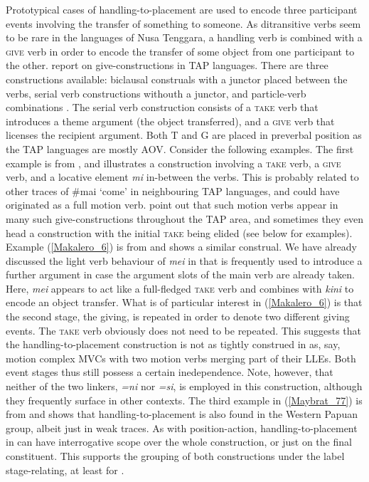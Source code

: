 Prototypical cases of handling-to-placement are used to encode three participant events involving the transfer of something to someone. As ditransitive verbs seem to be rare in the languages of Nusa Tenggara, a handling verb is combined with a \textsc{give} verb in order to encode the transfer of some object from one participant to the other. \citet{klamer2012development} report on give-constructions in TAP languages. There are three constructions available: biclausal construals with a junctor placed between the verbs, serial verb constructions withouth a junctor, and particle-verb combinations \citep{klamer2012development}. The serial verb construction consists of a \textsc{take} verb that introduces a theme argument (the object transferred), and a \textsc{give} verb that licenses the recipient argument. Both T and G are placed in preverbal position as the TAP languages are mostly AOV. Consider the following examples. The first example is from , and illustrates a construction involving a \textsc{take} verb, a \textsc{give} verb, and a locative element \textit{mi} in-between the verbs. This is probably related to other traces of \#mai `come' in neighbouring TAP languages, and could have originated as a full motion verb. \citet{klamer2012development} point out that such motion verbs appear in many such give-constructions throughout the TAP area, and sometimes they even head a construction with the initial \textsc{take} being elided (see below for examples). Example (\ref{Makalero_6}) is from  and shows a similar construal. We have already discussed the light verb behaviour of \textit{mei} in  that is frequently used to introduce a further argument in case the argument slots of the main verb are already taken. Here, \textit{mei} appears to act like a full-fledged \textsc{take} verb and combines with \textit{kini} to encode an object transfer. What is of particular interest in (\ref{Makalero_6}) is that the second stage, the giving, is repeated in order to denote two different giving events. The \textsc{take} verb obviously does not need to be repeated. This suggests that the handling-to-placement construction is not as tightly construed in  as, say, motion complex MVCs with two motion verbs merging part of their LLEs. Both event stages thus still possess a certain inedependence. Note, however, that neither of the two  linkers, \textit{=ni} nor \textit{=si}, is employed in this construction, although they frequently surface in other contexts. The third example in (\ref{Maybrat_77}) is from  and shows that handling-to-placement is also found in the Western Papuan group, albeit just in weak traces. As with position-action, handling-to-placement in  can have interrogative scope over the whole construction, or just on the final constituent. This supports the grouping of both constructions under the label stage-relating, at least for . 

